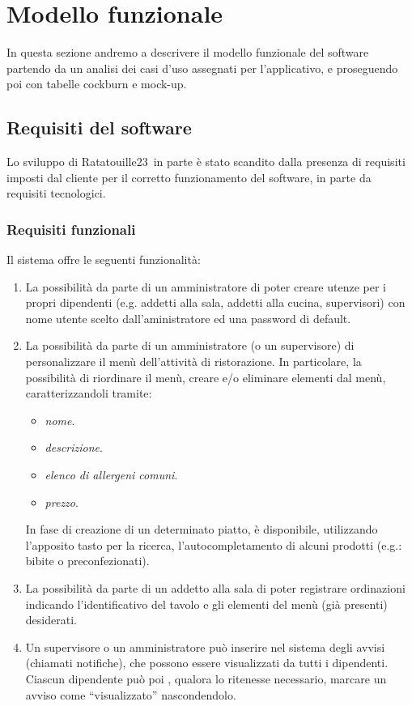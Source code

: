 \section{Modello funzionale}
In questa sezione andremo a descrivere il modello funzionale del software
partendo da un analisi dei casi d'uso assegnati per l'applicativo, e proseguendo poi con tabelle cockburn e mock-up.
\subsection{Requisiti del software}
Lo sviluppo di Ratatouille23\texttrademark\ in parte è stato scandito dalla presenza di requisiti imposti dal cliente per il corretto funzionamento del software, in parte da requisiti tecnologici.

\subsubsection{Requisiti funzionali}
Il sistema offre le seguenti funzionalità:
\begin{enumerate}
  \item La possibilità da parte di un amministratore di poter creare utenze per i propri dipendenti (e.g. addetti alla sala, addetti alla cucina, supervisori) con nome utente scelto dall'aministratore ed una password di default.

  \item La possibilità da parte di un amministratore (o un supervisore) di personalizzare il menù dell'attività di ristorazione. In particolare, la possibilità di riordinare il menù, creare e/o eliminare elementi dal menù, caratterizzandoli tramite:
        \begin{itemize}
          \item \textit{nome}.
          \item \textit{descrizione}.
          \item \textit{elenco di allergeni comuni}.
          \item \textit{prezzo}.
        \end{itemize}
        In fase di creazione di un determinato piatto, è disponibile, utilizzando l'apposito tasto per la ricerca, l'autocompletamento di alcuni prodotti (e.g.: bibite o preconfezionati).
  \item La possibilità da parte di un addetto alla sala di poter registrare ordinazioni indicando l'identificativo del tavolo e gli elementi del menù (già presenti) desiderati.
  \item Un supervisore o un amministratore può inserire nel sistema degli avvisi (chiamati notifiche), che possono essere
        visualizzati da tutti i dipendenti. Ciascun dipendente può poi , qualora lo ritenesse necessario, marcare un avviso come “visualizzato” nascondendolo.
\end{enumerate}

